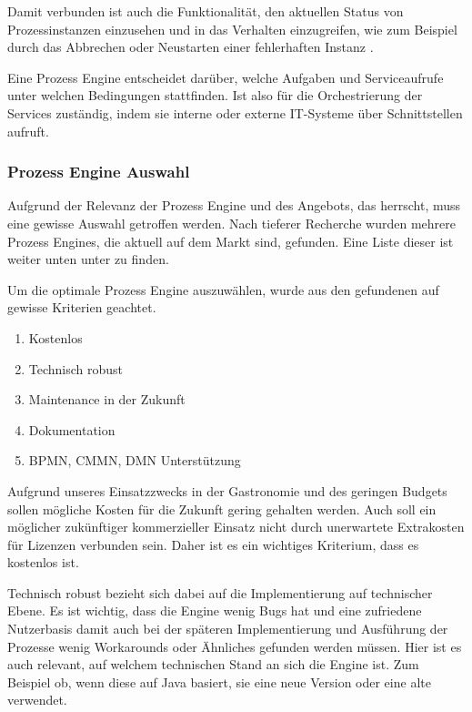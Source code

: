 Damit verbunden ist auch die Funktionalität, den aktuellen Status von Prozessinstanzen einzusehen und in das Verhalten einzugreifen, wie zum Beispiel durch das Abbrechen oder Neustarten einer fehlerhaften Instanz \citep[vgl.][S.226]{freund_praxishandbuch_2017}.

Eine Prozess Engine entscheidet darüber, welche Aufgaben und Serviceaufrufe unter welchen Bedingungen stattfinden. Ist also für die Orchestrierung der Services zuständig, indem sie interne oder externe IT-Systeme über Schnittstellen aufruft. \citep[vgl.][S. 6]{freund_praxishandbuch_2017}

\subsubsection{Prozess Engine Auswahl}
\label{sec:process_engine_auswahl}

Aufgrund der Relevanz der Prozess Engine und des Angebots, das herrscht, muss eine gewisse Auswahl getroffen werden. Nach tieferer Recherche wurden mehrere Prozess Engines, die aktuell auf dem Markt sind, gefunden. Eine Liste dieser ist weiter unten unter  zu finden. 

Um die optimale Prozess Engine auszuwählen, wurde aus den gefundenen auf gewisse Kriterien geachtet. 
\begin{enumerate}
    \item Kostenlos
    \item Technisch robust
    \item Maintenance in der Zukunft
    \item Dokumentation
    \item \acs{BPMN}, \acs{CMMN}, \acs{DMN} Unterstützung
\end{enumerate}

\label{par:kostenlose_process_engines_auswahl}
Aufgrund unseres Einsatzzwecks in der Gastronomie und des geringen Budgets sollen mögliche Kosten für die Zukunft gering gehalten werden. Auch soll ein möglicher zukünftiger kommerzieller Einsatz nicht durch unerwartete Extrakosten für Lizenzen verbunden sein. Daher ist es ein wichtiges Kriterium, dass es kostenlos ist.

Technisch robust bezieht sich dabei auf die Implementierung auf technischer Ebene. Es ist wichtig, dass die Engine wenig Bugs hat und eine zufriedene Nutzerbasis damit auch bei der späteren Implementierung und Ausführung der Prozesse wenig Workarounds oder Ähnliches gefunden werden müssen. Hier ist es auch relevant, auf welchem technischen Stand an sich die Engine ist. Zum Beispiel ob, wenn diese auf Java basiert, sie eine neue Version oder eine alte verwendet. 

